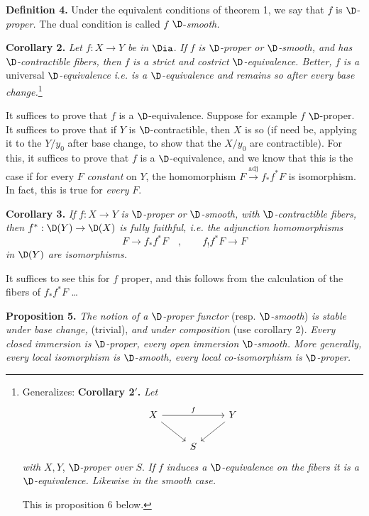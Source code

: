 \noindent\textbf{Definition 4.} Under the equivalent conditions of theorem 1, we say that $f$ is $\D$-\textit{proper.} The dual condition is called $f$ $\D$-\textit{smooth.}

\noindent\textbf{Corollary 2.} \textit{Let} $f : X \to Y$ \textit{be in} $\Dia$. \textit{If} $f$ \textit{is} $\D$\textit{-proper or} $\D$\textit{-smooth, and has} $\D$\textit{-contractible fibers, then} $f$ \textit{is a strict and costrict} $\D$\textit{-equivalence. Better,} $f$ \textit{is a} universal $\D$\textit{-equivalence} \textit{i.e. is a} $\D$\textit{-equivalence and remains so after every base change.}\footnote[31]{Generalizes: \textbf{Corollary 2$'$.} \textit{Let}
\[
\begin{tikzcd}[ampersand replacement=\&]
X \arrow[rr, "f"] \arrow[dr] \& \& Y \arrow[dl] \\
\& S \&
\end{tikzcd}
\]
\textit{with} $X, Y$, $\D$\textit{-proper over} $S$. \textit{If} $f$ \textit{induces a} $\D$\textit{-equivalence on the fibers it is a} $\D$\textit{-equivalence. Likewise in the smooth case.}\par
This is proposition 6 below.}


\noindent It suffices to prove that $f$ is a $\D$-equivalence. Suppose for example $f$ $\D$-proper. It suffices to prove that if $Y$ is $\D$-contractible, then $X$ is so (if need be, applying it to the $Y/y_0$ after base change, to show that the $X/y_0$ are contractible). For this, it suffices to prove that $f$ is a $\D$-equivalence, and we know that this is the case if for every $F$ \textit{constant} on $Y$, the homomorphism $F \overset{\text{adj}}{\longrightarrow} f_*f^*F$ is isomorphism. In fact, this is true for \textit{every} $F$.

\noindent\textbf{Corollary 3.} \textit{If} $f : X \to Y$ \textit{is} $\D$\textit{-proper or} $\D$\textit{-smooth, with} $\D$\textit{-contractible fibers, then} $f^* : \D(Y) \to \D(X)$ \textit{is fully faithful, i.e. the adjunction homomorphisms}
\[
F \longrightarrow f_*f^*F \quad , \qquad f_!f^*F \longrightarrow F
\]
\textit{in} $\D(Y)$ \textit{are isomorphisms.}

\noindent It suffices to see this for $f$ proper, and this follows from the calculation of the fibers of $f_*f^*F$ \ldots

\noindent\textbf{Proposition 5.} \textit{The notion of a} $\D$\textit{-proper functor} (resp. $\D$\textit{-smooth}) \textit{is stable under base change,} (trivial), \textit{and under composition} (use corollary 2). \textit{Every closed immersion is} $\D$\textit{-proper, every open immersion} $\D$\textit{-smooth. More generally, every local isomorphism is} $\D$\textit{-smooth, every local co-isomorphism is} $\D$\textit{-proper.}

